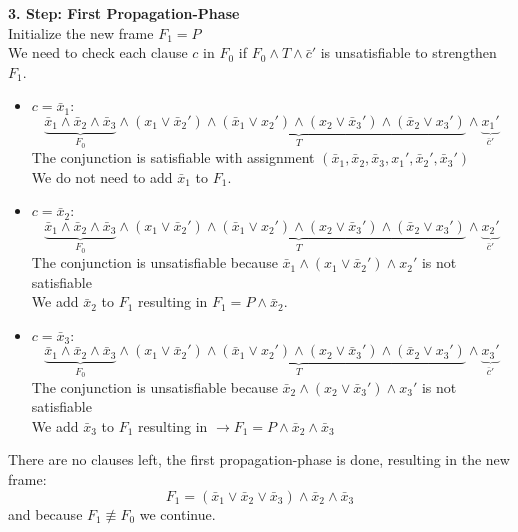 \documentclass[11pt, a4paper, BCOR=10mm, ngerman, oneside]{scrbook}
\begin{document}
\textbf{3. Step: First Propagation-Phase} \\
Initialize the new frame $F_1 = P$ \\
We need to check each clause $c$ in $F_0$ if $F_0 \land T \land \bar c'$ is unsatisfiable to strengthen $F_1$.
\begin{itemize}
\item $c = \bar x_1:$
\begin{equation*}
\underbrace{\bar x_1 \land \bar x_2 \land \bar x_3}_{F_0} \land \underbrace{(x_1 \lor \bar x_2' ) \land ( \bar x_1 \lor x_2') \land (x_2 \lor \bar x_3') \land ( \bar x_2 \lor x_3')}_{T} \land \underbrace{x_1'}_{\bar c'}
\end{equation*}
The conjunction is satisfiable with assignment $(\bar x_1, \bar x_2, \bar x_3, x_1', \bar x_2', \bar x_3')$ \\ 
We do not need to add $\bar x_1$ to $F_1$. \\

\item $c = \bar x_2:$
\begin{equation*}
\underbrace{\bar x_1 \land \bar x_2 \land \bar x_3}_{F_0} \land \underbrace{(x_1 \lor \bar x_2' ) \land ( \bar x_1 \lor x_2') \land (x_2 \lor \bar x_3') \land ( \bar x_2 \lor x_3')}_{T} \land \underbrace{x_2'}_{\bar c'}
\end{equation*}
The conjunction is unsatisfiable because $\bar x_1 \land (x_1 \lor \bar x_2') \land x_2'$ is not satisfiable \\ We add $\bar x_2$ to $F_1$ resulting in $F_1 = P \land \bar x_2$. \\

\item $c = \bar x_3:$
\begin{equation*}
\underbrace{\bar x_1 \land \bar x_2 \land \bar x_3}_{F_0} \land \underbrace{(x_1 \lor \bar x_2' ) \land ( \bar x_1 \lor x_2') \land (x_2 \lor \bar x_3') \land ( \bar x_2 \lor x_3')}_{T} \land \underbrace{x_3'}_{\bar c'}
\end{equation*}
The conjunction is unsatisfiable because $\bar x_2 \land (x_2 \lor \bar x_3') \land x_3'$ is not satisfiable \\ We add $\bar x_3$ to $F_1$ resulting in $\rightarrow F_1 = P \land \bar x_2 \land \bar x_3$
\end{itemize}
There are no clauses left, the first propagation-phase is done, resulting in the new frame:
\begin{equation*}
 F_1 = (\bar x_1 \lor \bar x_2 \lor \bar x_3) \land \bar x_2 \land \bar x_3
\end{equation*}
and because $F_1 \not\equiv F_0$ we continue. \\ \\ \par
\end{document}
